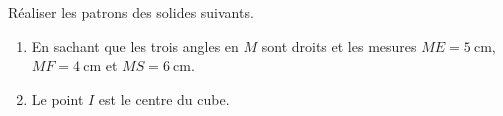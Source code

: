 
\begin{exercice}\label{exo2smath-0184}

    Réaliser les patrons des solides suivants.
            

    \begin{enumerate}

    \item
    En sachant que les trois angles en \( M\) sont droits et les mesures \( ME=\SI{5}{\centi\meter}\), \( MF=\SI{4}{\centi\meter}\) et \( MS=\SI{6}{\centi\meter}\). 

\item\label{ItemTDFMooPuUJaDii}

    Le point \( I\) est le centre du cube.
    \end{enumerate}

      
   


\end{exercice}
